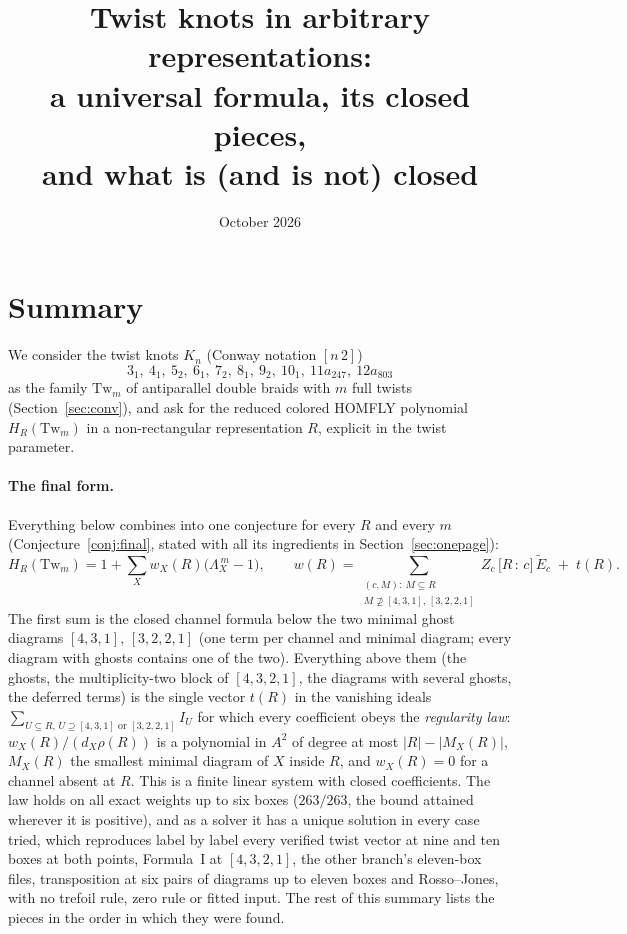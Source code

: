 \documentclass[11pt]{article}
\title{Twist knots in arbitrary representations:\\ a universal formula, its closed pieces,\\ and what is (and is not) closed}
\author{}
\date{October 2026}
\newcommand{\Tw}{\mathrm{Tw}}
\newcommand{\Lam}{\Lambda}
\newcommand{\Et}{\widetilde{E}}
\newcommand{\cf}[2]{\bigl[#1\,{:}\,#2\bigr]}
\begin{document}
\maketitle

\section{Summary}

We consider the twist knots $K_n$ (Conway notation $[n\,2]$)
\[
3_1,\ 4_1,\ 5_2,\ 6_1,\ 7_2,\ 8_1,\ 9_2,\ 10_1,\ 11a_{247},\ 12a_{803}
\]
as the family $\Tw_m$ of antiparallel double braids with $m$ full twists (Section~\ref{sec:conv}), and ask for the
reduced colored HOMFLY polynomial $H_R(\Tw_m)$ in a non-rectangular representation $R$, explicit in the twist
parameter.

\paragraph{The final form.}  Everything below combines into one conjecture for every $R$ and every $m$
(Conjecture~\ref{conj:final}, stated with all its ingredients in Section~\ref{sec:onepage}):
\[
H_R(\Tw_m)=1+\sum_Xw_X(R)\bigl(\Lam_X^{\,m}-1\bigr),\qquad
w(R)=\sum_{\substack{(c,M):\ M\subseteq R\\ M\not\supseteq[4,3,1],\,[3,2,2,1]}}Z_c\,\cf Rc\,\Et_c\;+\;t(R).
\]
The first sum is the closed channel formula below the two minimal ghost diagrams $[4,3,1]$, $[3,2,2,1]$ (one term per
channel and minimal diagram; every diagram with ghosts contains one of the two).  Everything above them (the ghosts, the
multiplicity-two block of $[4,3,2,1]$, the diagrams with several ghosts, the deferred terms) is the single vector $t(R)$
in the vanishing ideals $\sum_{U\subseteq R,\,U\supseteq[4,3,1]\text{ or }[3,2,2,1]}I_U$ for which every coefficient
obeys the \emph{regularity law}: $w_X(R)/(d_X\rho(R))$ is a polynomial in $A^2$ of degree at most $|R|-|M_X(R)|$,
$M_X(R)$ the smallest minimal diagram of $X$ inside $R$, and $w_X(R)=0$ for a channel absent at $R$.  This is a finite
linear system with closed coefficients.  The law holds on all exact weights up to six boxes ($263/263$, the bound attained
wherever it is positive), and as a solver it has a unique solution in every case tried, which reproduces label by label
every verified twist vector at nine and ten boxes at both points, Formula~I at $[4,3,2,1]$, the other branch's
eleven-box files, transposition at six pairs of diagrams up to eleven boxes and Rosso--Jones, with no trefoil rule, zero
rule or fitted input.  The rest of this summary lists the pieces in the order in which they were found.
\end{document}
